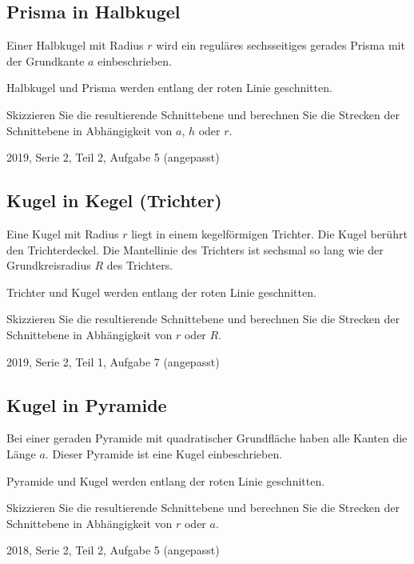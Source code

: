 \subsection{Prisma in Halbkugel}
Einer Halbkugel mit Radius $r$ wird ein reguläres sechsseitiges
gerades Prisma mit der Grundkante $a$ einbeschrieben.

Halbkugel und Prisma werden entlang der roten Linie geschnitten.

Skizzieren Sie die resultierende Schnittebene und berechnen Sie
die Strecken der Schnittebene in Abhängigkeit von $a$, $h$ oder $r$.

{\tiny{2019, Serie 2, Teil 2, Aufgabe 5 (angepasst)}}


\subsection{Kugel in Kegel (Trichter)}

Eine Kugel mit Radius $r$ liegt in einem kegelförmigen Trichter.
Die Kugel berührt den Trichterdeckel. Die Mantellinie des Trichters
ist sechsmal so lang wie der Grundkreisradius $R$ des Trichters.

Trichter und Kugel werden entlang der roten Linie geschnitten.

Skizzieren Sie die resultierende Schnittebene und berechnen
Sie die Strecken der Schnittebene in Abhängigkeit von $r$ oder $R$.

{\tiny{2019, Serie 2, Teil 1, Aufgabe 7 (angepasst)}}


\subsection{Kugel in Pyramide}
Bei einer geraden Pyramide mit quadratischer Grundfläche haben alle
Kanten die Länge $a$. Dieser Pyramide ist eine Kugel einbeschrieben.

Pyramide und Kugel werden entlang der roten Linie geschnitten.

Skizzieren Sie die resultierende Schnittebene und berechnen
Sie die Strecken der Schnittebene in Abhängigkeit von $r$ oder $a$.

{\tiny{2018, Serie 2, Teil 2, Aufgabe 5 (angepasst)}}




